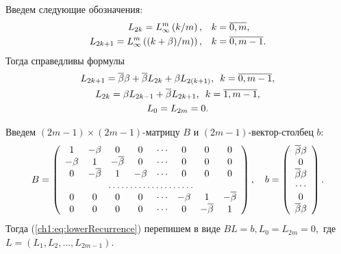 {Введем следующие обозначения:
\begin{align*}
  L_{2k} = L_{\infty}^m\left({k/m}\right), & \quad k = \overline{0, m},\\
  L_{2k+1} = L_{\infty}^m\left({(k+\beta)/m)}\right), & \quad k = \overline{0, m-1}.
\end{align*}
Тогда справедливы формулы
\begin{equation}
  \label{ch1:eq:lowerRecurrence}
  \begin{gathered}
    L_{2k+1} = \overline{\beta}\beta + \overline{\beta} L_{2k} + \beta L_{2(k+1)}, \enskip k = \overline{0, m-1},\\
    L_{2k} = \beta L_{2k-1} + \overline{\beta} L_{2k+1}, \enskip k = \overline{1, m-1},\\
    L_0 = L_{2m} = 0.
  \end{gathered}
\end{equation}

Введем $(2m-1)\times(2m-1)$-матрицу $B$ и $(2m-1)$-вектор-столбец $b$:
\begin{equation*}
  B =
  \left(
    \begin{array}{cccccccc}
      1      & -\Co  & 0       & 0      & \cdots & 0      & 0       & 0       \\
      -\Co & 1       & -\DCo & 0      & \cdots & 0      & 0       & 0       \\
      0      & -\DCo & 1       & -\Co & \cdots & 0      & 0       & 0       \\
      \hdotsfor{8}                                                              \\
      0      & 0       & 0       & 0      & \cdots & -\Co & 1       & -\DCo \\
      0      & 0       & 0       & 0      & \cdots & 0      & -\DCo & 1 
    \end{array}
  \right),\quad
  b = \left(
    \begin{array}{c}
      \DCo\Co \\
      0           \\
      \DCo\Co \\
      \cdots      \\
      0           \\
      \DCo\Co
    \end{array}
  \right).
\end{equation*}
Тогда (\ref{ch1:eq:lowerRecurrence}) перепишем в виде $ BL = b, L_0 = L_{2m} = 0, $
где $L = (L_1, L_2, \ldots, L_{2m-1})$.

}
